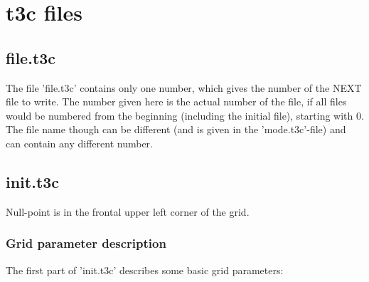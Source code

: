 
\section{t3c files}

\subsection{file.t3c}
The file 'file.t3c' contains only one number, which gives the number of the NEXT file to write.
The number given here is the actual number of the file, if all files would be numbered from the beginning (including the initial file), starting with 0.
The file name though can be different (and is given in the 'mode.t3c'-file) and can contain any different number.

\subsection{init.t3c}
Null-point is in the frontal upper left corner of the grid.

\subsubsection{Grid parameter description}

The first part of 'init.t3c' describes some basic grid parameters:


